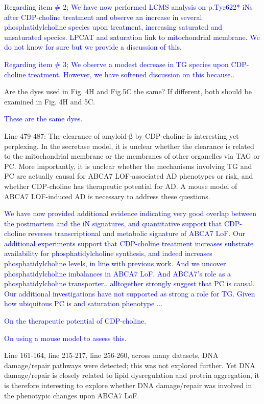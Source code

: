 \textcolor{blue}{Regarding item # 2; We have now performed LCMS analysis on p.Tyr622* iNs after CDP-choline treatment and observe an increase in several phosphatidylcholine species upon treatment, increasing saturated and unsaturated species. LPCAT and saturation link to mitochondrial membrane. We do not know for sure but we provide a discussion of this.}

\textcolor{blue}{Regarding item # 3; We observe a modest decrease in TG species upon CDP-choline treatment. However, we have softened discussion on this because..}

Are the dyes used in Fig. 4H and Fig.5C the same? If different, both should be examined in Fig. 4H and 5C.

\textcolor{blue}{These are the same dyes.}

Line 479-487: The clearance of amyloid-β by CDP-choline is interesting yet perplexing. In the secretase model, it is unclear whether the clearance is related to the mitochondrial membrane or the membranes of other organelles via TAG or PC. More importantly, it is unclear whether the mechanisms involving TG and PC are actually causal for ABCA7 LOF-associated AD phenotypes or risk, and whether CDP-choline has therapeutic potential for AD. A mouse model of ABCA7 LOF-induced AD is necessary to address these questions.

\textcolor{blue}{We have now provided additional evidence indicating very good overlap between the postmortem and the iN signatures, and quantitative support that CDP-choline reverses transcriptional and metabolic signature of ABCA7 LoF. Our additional experiments support that CDP-choline treatment increases substrate availability for phosphatidylcholine synthesis, and indeed increases phosphatidylcholine levels, in line with previous work. And we uncover phosphatidylcholine imbalances in ABCA7 LoF. And ABCA7's role as a phosphatidylcholine transporter.. alltogether strongly suggest that PC is causal. Our additional investigations have not supported as strong a role for TG. Given how ubiquitous PC is and saturation phenotype ...}

\textcolor{blue}{On the therapeutic potential of CDP-choline}.

\textcolor{blue}{On using a mouse model to assess this.}

Line 161-164, line 215-217, line 256-260, across many datasets, DNA damage/repair pathways were detected; this was not explored further. Yet DNA damage/repair is closely related to lipid dysregulation and protein aggregation, it is therefore interesting to explore whether DNA damage/repair was involved in the phenotypic changes upon ABCA7 LoF.

